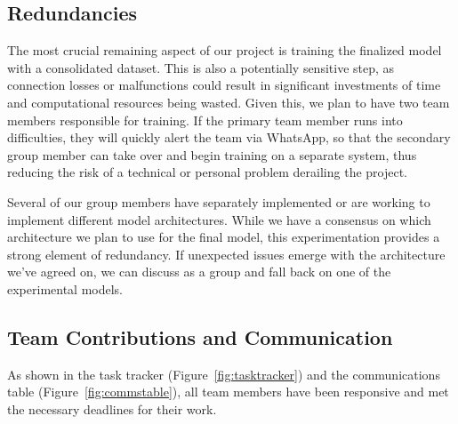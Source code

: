 \documentclass{article} %
\begin{document}
\subsection{Redundancies}

The most crucial remaining aspect of our project is training the finalized model with a consolidated dataset. This is also a potentially sensitive step, as connection losses or malfunctions could result in significant investments of time and computational resources being wasted. Given this, we plan to have two team members responsible for training. If the primary team member runs into difficulties, they will quickly alert the team via WhatsApp, so that the secondary group member can take over and begin training on a separate system, thus reducing the risk of a technical or personal problem derailing the project.

Several of our group members have separately implemented or are working to implement different model architectures. While we have a consensus on which architecture we plan to use for the final model, this experimentation provides a strong element of redundancy. If unexpected issues emerge with the architecture we've agreed on, we can discuss as a group and fall back on one of the experimental models.

\subsection{Team Contributions and Communication}

As shown in the task tracker (Figure~\ref{fig:tasktracker}) and the communications table (Figure~\ref{fig:commstable}), all team members have been responsive and met the necessary deadlines for their work.


\end{document}
